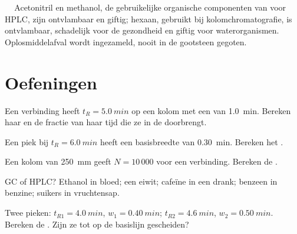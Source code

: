 \begin{safety}{\,\,\,\,\,}
Acetonitril en methanol, de gebruikelijke organische componenten van  voor HPLC, zijn ontvlambaar en giftig;
hexaan, gebruikt bij kolomchromatografie, is ontvlambaar, schadelijk voor de gezondheid en giftig voor waterorganismen.
Oplosmiddelafval wordt ingezameld, nooit in de gootsteen gegoten.
\end{safety}

\section{Oefeningen}

\begin{exercise}[$\star$]\label{exo:b2:chromatography:1}
Een verbinding heeft $t_R = \qty{5.0}{min}$ op een kolom met een  van \qty{1.0}{min}. Bereken haar
 en de fractie van haar tijd die ze in de  doorbrengt.
\end{exercise}

\begin{exercise}[$\star$]\label{exo:b2:chromatography:2}
Een piek bij $t_R = \qty{6.0}{min}$ heeft een basisbreedte van \qty{0.30}{min}. Bereken het .
\end{exercise}

\begin{exercise}[$\star$]\label{exo:b2:chromatography:3}
Een kolom van \qty{250}{mm} geeft $N = 10\,000$ voor een verbinding. Bereken de .
\end{exercise}

\begin{exercise}[$\star$]\label{exo:b2:chromatography:4}
GC of HPLC? Ethanol in bloed; een eiwit; cafeïne in een drank; benzeen in benzine; suikers in vruchtensap.
\end{exercise}

\begin{exercise}[$\star\star$]\label{exo:b2:chromatography:5}
Twee pieken: $t_{R1} = \qty{4.0}{min}$, $w_1 = \qty{0.40}{min}$; $t_{R2} = \qty{4.6}{min}$, $w_2 =
\qty{0.50}{min}$. Bereken de . Zijn ze tot op de basislijn gescheiden?
\end{exercise}

